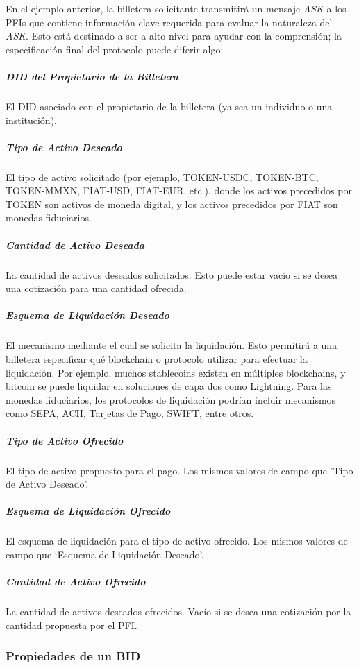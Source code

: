 \documentclass[11pt]{article}
\begin{document}
En el ejemplo anterior, la billetera solicitante transmitirá un mensaje \textit{ASK} a los PFIs que contiene información clave requerida para evaluar la naturaleza del \textit{ASK}. Esto está destinado a ser a alto nivel para ayudar con la comprensión; la especificación final del protocolo puede diferir algo: \ \ 

\subparagraph{DID del Propietario de la Billetera}

El DID asociado con el propietario de la billetera (ya sea un individuo o una institución).

\subparagraph{Tipo de Activo Deseado}

El tipo de activo solicitado (por ejemplo, TOKEN-USDC, TOKEN-BTC, TOKEN-MMXN, FIAT-USD, FIAT-EUR, etc.), donde los activos precedidos por TOKEN son activos de moneda digital, y los activos precedidos por FIAT son monedas fiduciarios.\textit{ }

\subparagraph{Cantidad de Activo Deseada}

La cantidad de activos deseados solicitados. Esto puede estar vacío si se desea una cotización para una cantidad ofrecida. 

\subparagraph{Esquema de Liquidación Deseado}

El mecanismo mediante el cual se solicita la liquidación. Esto permitirá a una billetera especificar qué blockchain o protocolo utilizar para efectuar la liquidación. Por ejemplo, muchos stablecoins existen en múltiples blockchains, y bitcoin se puede liquidar en soluciones de capa dos como Lightning. Para las monedas fiduciarios, los protocolos de liquidación podrían incluir mecanismos como SEPA, ACH, Tarjetas de Pago, SWIFT, entre otros.

\subparagraph{Tipo de Activo Ofrecido}

El tipo de activo propuesto para el pago. Los mismos valores de campo que 'Tipo de Activo Deseado'.

\subparagraph{Esquema de Liquidación Ofrecido}

El esquema de liquidación para el tipo de activo ofrecido. Los mismos valores de campo que ‘Esquema de Liquidación Deseado’.

\subparagraph{Cantidad de Activo Ofrecido}

La cantidad de activos deseados ofrecidos. Vacío si se desea una cotización por la cantidad propuesta por el PFI. 

\vspace{1\baselineskip}
\subsubsection{Propiedades de un BID}
\end{document}
